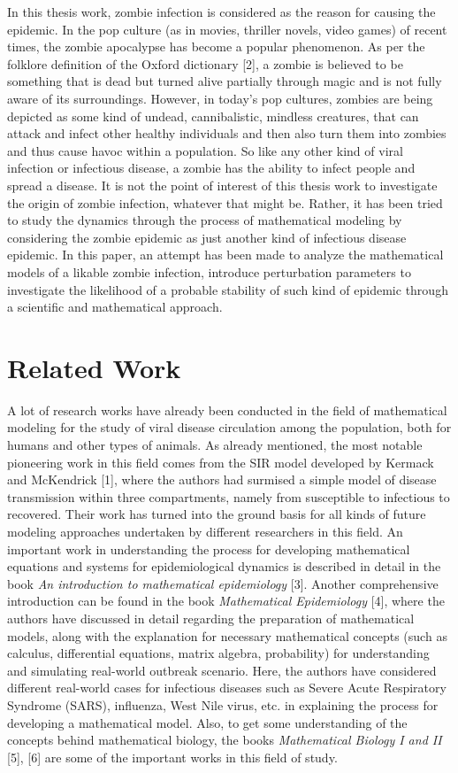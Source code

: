 
In this thesis work, zombie infection is considered as the reason for causing the epidemic. In the pop culture (as in movies, thriller novels, video games) of recent times, the zombie apocalypse has become a popular phenomenon. As per the folklore definition of the Oxford dictionary [2], a zombie is believed to be something that is dead but turned alive partially through magic and is not fully aware of its surroundings. However, in today's pop cultures, zombies are being depicted as some kind of undead, cannibalistic, mindless creatures, that can attack and infect other healthy individuals and then also turn them into zombies and thus cause havoc within a population. So like any other kind of viral infection or infectious disease, a zombie has the ability to infect people and spread a disease. It is not the point of interest of this thesis work to investigate the origin of zombie infection, whatever that might be. Rather, it has been tried to study the dynamics through the process of mathematical modeling by considering the zombie epidemic as just another kind of infectious disease epidemic. In this paper, an attempt has been made to analyze the mathematical models of a likable zombie infection, introduce perturbation parameters to investigate the likelihood of a probable stability of such kind of epidemic through a scientific and mathematical approach. 

\pagebreak
\section{Related Work}

    A lot of research works have already been conducted in the field of mathematical modeling for the study of viral disease circulation among the population, both for humans and other types of animals. As already mentioned, the most notable pioneering work in this field comes from the SIR model developed by Kermack and McKendrick [1], where the authors had surmised a simple model of disease transmission within three compartments, namely from susceptible to infectious to recovered. Their work has turned into the ground basis for all kinds of future modeling approaches undertaken by different researchers in this field. An important work in understanding the process for developing mathematical equations and systems for epidemiological dynamics is described in detail in the book \emph{An introduction to mathematical epidemiology} [3]. Another comprehensive introduction can be found in the book \emph{Mathematical Epidemiology} [4], where the authors have discussed in detail regarding the preparation of mathematical models, along with the explanation for necessary mathematical concepts (such as calculus, differential equations, matrix algebra, probability) for understanding and simulating real-world outbreak scenario. Here, the authors have considered different real-world cases for infectious diseases such as Severe Acute Respiratory Syndrome (SARS), influenza, West Nile virus, etc. in explaining the process for developing a mathematical model. Also, to get some understanding of the concepts behind mathematical biology, the books \emph{Mathematical Biology I and II} [5], [6] are some of the important works in this field of study. \\


